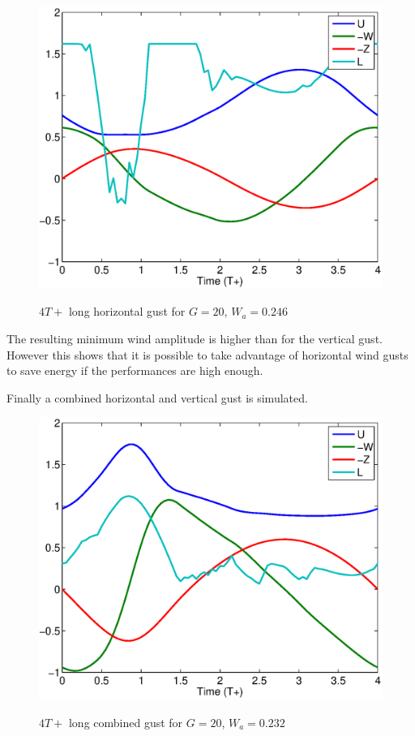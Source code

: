 \begin{figure}[h]
  \begin{center}
    \scalebox{0.8}
    {\includegraphics{./Figures/Windtype=2_Tg=4_Wg=0p246_quad_G=20.eps}}
  \end{center}
  \caption{$4T+$ long horizontal gust for $G=20$, $W_a=0.246$}
  \label{fig:Horizontal_optimization}
\end{figure}

The resulting minimum wind amplitude is higher than for the vertical gust. 
However this shows that it is possible to take advantage of horizontal wind gusts to save energy if the performances are high enough.

\par Finally a combined horizontal and vertical gust is simulated.

\begin{figure}[h]
  \begin{center}
    \scalebox{0.8}
    {\includegraphics{./Figures/Windtype=3_Tg=4_Wg=0p232_quad_G=20.eps}}
  \end{center}
  \caption{$4T+$ long combined gust for $G=20$, $W_a=0.232$}
  \label{fig:combined_optimization}
\end{figure}

